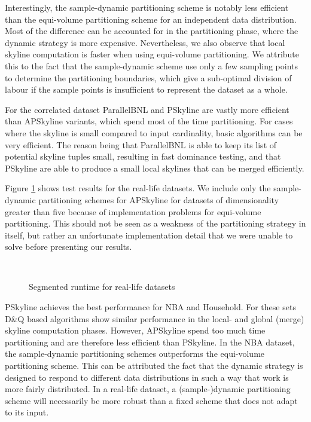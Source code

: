 \documentclass[12pt,a4paper,twoside]{report}
\begin{document}
Interestingly, the sample-dynamic partitioning scheme is notably less
efficient than the equi-volume partitioning scheme for an independent
data distribution. Most of the difference can be accounted for in the
partitioning phase, where the dynamic strategy is more expensive.
Nevertheless, we also observe that local skyline computation is faster
when using equi-volume partitioning. We attribute this to the fact
that the sample-dynamic scheme use only a few sampling points to
determine the partitioning boundaries, which give a sub-optimal
division of labour if the sample points is insufficient to represent
the dataset as a whole.

For the correlated dataset ParallelBNL and PSkyline are vastly more
efficient than APSkyline variants, which spend most of the time
partitioning. For cases where the skyline is small compared to input
cardinality, basic algorithms can be very efficient. The reason being
that ParallelBNL is able to keep its list of potential skyline tuples
small, resulting in fast dominance testing, and that PSkyline are able
to produce a small local skylines that can be merged efficiently.

Figure \ref{fig:test-distribution-real} shows test results for the
real-life datasets. We include only the sample-dynamic partitioning
schemes for APSkyline for datasets of dimensionality greater than five
because of implementation problems for equi-volume partitioning. This
should not be seen as a weakness of the partitioning strategy in
itself, but rather an unfortunate implementation detail that we were
unable to solve before presenting our results.

\begin{figure}[H]
	\centering
		\\
	\caption{Segmented runtime for real-life datasets}
	\label{fig:test-distribution-real}
\end{figure}

PSkyline achieves the best performance for NBA and Household. For
these sets D\&Q based algorithms show similar performance in the
local- and global (merge) skyline computation phases. However,
APSkyline spend too much time partitioning and are therefore less
efficient than PSkyline. In the NBA dataset, the sample-dynamic
partitioning schemes outperforms the equi-volume partitioning scheme.
This can be attributed the fact that the dynamic strategy is designed
to respond to different data distributions in such a way that work is
more fairly distributed. In a real-life dataset, a (sample-)dynamic
partitioning scheme will necessarily be more robust than a fixed
scheme that does not adapt to its input.
\end{document}
